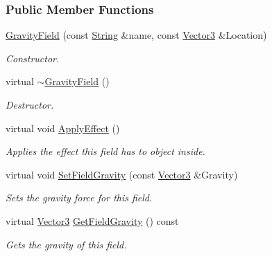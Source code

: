 \subsubsection*{Public Member Functions}
\begin{DoxyCompactItemize}
\item 
\hyperlink{classphys_1_1GravityField_aece29280051e47dc6e5bd10fd3bf99c9}{GravityField} (const \hyperlink{namespacephys_aa03900411993de7fbfec4789bc1d392e}{String} \&name, const \hyperlink{classphys_1_1Vector3}{Vector3} \&Location)
\begin{DoxyCompactList}\small\item\em Constructor. \item\end{DoxyCompactList}\item 
virtual \hyperlink{classphys_1_1GravityField_ae41a656b247a2982da2e1ae666c605d0}{$\sim$GravityField} ()
\begin{DoxyCompactList}\small\item\em Destructor. \item\end{DoxyCompactList}\item 
virtual void \hyperlink{classphys_1_1GravityField_a0322cb1635bbcb951493d9e17cc9acb1}{ApplyEffect} ()
\begin{DoxyCompactList}\small\item\em Applies the effect this field has to object inside. \item\end{DoxyCompactList}\item 
virtual void \hyperlink{classphys_1_1GravityField_a4a784189c09ad4ce6806e0e92be2bc1c}{SetFieldGravity} (const \hyperlink{classphys_1_1Vector3}{Vector3} \&Gravity)
\begin{DoxyCompactList}\small\item\em Sets the gravity force for this field. \item\end{DoxyCompactList}\item 
virtual \hyperlink{classphys_1_1Vector3}{Vector3} \hyperlink{classphys_1_1GravityField_a60473dfc835825b24fe67a86f4bc451e}{GetFieldGravity} () const 
\begin{DoxyCompactList}\small\item\em Gets the gravity of this field. \item\end{DoxyCompactList}\end{DoxyCompactItemize}
